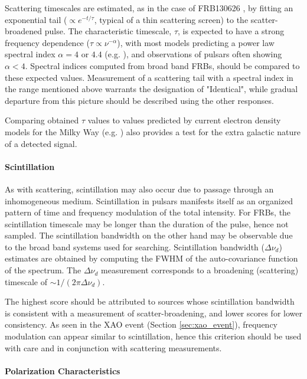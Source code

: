 \documentclass[a4paper,fleqn,usenatbib]{mnras}
\begin{document}
Scattering timescales are estimated, as in the case of FRB130626
\citep{2016MNRAS.460L..30C}, by fitting an exponential tail ($\propto
e^{-t/\tau}$, typical of a thin scattering screen) to the scatter-broadened
pulse. The characteristic timescale, $\tau$, is expected to have a strong
frequency dependence ($\tau \propto \nu^{-\alpha}$), with most models predicting
a power law spectral index $\alpha =4$ or $4.4$ (e.g. \citealt{Rickett1977}),
and observations of pulsars often showing $\alpha < 4$.  Spectral indices
computed from broad band FRBs, should be compared to these expected values.
Measurement of a scattering tail with a spectral index in the range mentioned
above warrants the designation of "Identical", while gradual departure from this
picture should be described using the other responses. 

Comparing obtained $\tau$ values to values predicted by current electron density
models for the Milky Way (e.g.
\citealt{2002astro.ph..7156C,2017ApJ...835...29Y}) also provides a test for the
extra galactic nature of a detected signal.

\paragraph{Scintillation}

As with scattering, scintillation may also occur due to passage through an
inhomogeneous medium. Scintillation in pulsars manifests itself as an organized
pattern of time and frequency modulation of the total intensity. For FRBs, the
scintillation timescale may be longer than the duration of the pulse, hence not
sampled. The scintillation bandwidth on the other hand may be observable due to
the broad band systems used for searching.  Scintillation bandwidth ($\Delta
\nu_d$) estimates are obtained by computing the FWHM of the auto-covariance
function of the spectrum.  The $\Delta \nu_d$ measurement corresponds to a
broadening (scattering) timescale of $\sim 1/(2\pi\Delta \nu_d)$.  

The highest score should be attributed to sources whose scintillation bandwidth
is consistent with a measurement of scatter-broadening, and lower scores for
lower consistency. As seen in the XAO event (Section \ref{sec:xao_event}),
frequency modulation can appear similar to scintillation, hence this criterion
should be used with care and in conjunction with scattering measurements. 

\paragraph{Polarization Characteristics}
\end{document}
